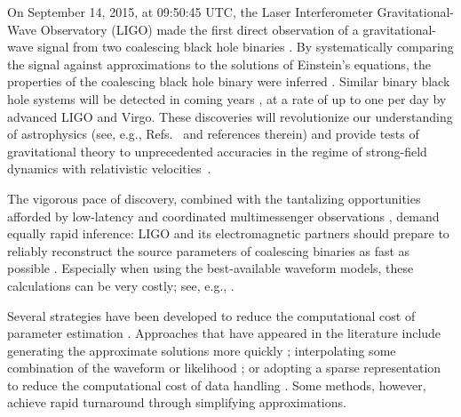 \documentclass[aps,prd,nofootinbib,showpacs,amssymb,twocolumn]{revtex4}
\begin{document}
%
On September 14, 2015, at 09:50:45 UTC, 
the Laser Interferometer Gravitational-Wave Observatory (LIGO) made the first direct 
observation of a gravitational-wave signal from two coalescing black hole binaries \cite{DiscoveryPaper}. By
systematically comparing the signal against approximations to the solutions 
%
of Einstein's equations, the properties of
the coalescing black hole binary  were inferred \cite{PEPaper}. 
%
Similar binary black hole systems will be detected in coming
years \cite{RatesPaper,LIGO-O1-BBH}, at a rate of up to one per day by advanced LIGO and Virgo.  These discoveries will revolutionize our understanding of
astrophysics (see, e.g., 
Refs.~\cite{AstroPaper,2016Natur.534..512B,2016ApJ...824L...8R,2016PhRvL.116t1301B,2016MNRAS.460.3545D} and references therein) and provide tests of gravitational theory to unprecedented accuracies 
in the regime of strong-field dynamics
with relativistic velocities~\cite{TheLIGOScientific:2016src,LIGO-O1-BBH}.

%
%
The  vigorous pace of discovery, combined with the tantalizing opportunities afforded by low-latency and coordinated
multimessenger observations \cite{2016LRR....19....1A}, demand equally rapid inference: LIGO and its electromagnetic partners should prepare to
reliably reconstruct the source parameters of coalescing binaries as fast as possible \cite{LIGO-whitepaper-2015}.  
Especially when using the best-available waveform models, these calculations can be very costly; see, e.g., \cite{SEOBv3Paper}.

Several strategies have been
developed to reduce the 
%
computational cost of parameter estimation \cite{gwastro-pe-Brandon-STF2,gwastro-PE-AlternativeArchitectures,gw-astro-ReducedOrderQuadraturePE-TiglioEtAl2014,2016PhRvD..94d4031S,2017arXiv170302062V}.  
%
Approaches that have appeared in the literature include
%
generating the approximate solutions more quickly \cite{gwastro-mergers-PE-ReducedOrder-2013,2014PhRvX...4c1006F,2013PhRvD..87l2002S,2013PhRvD..87d4008C,gwastro-mergers-IMRPhenomP,gwastro-SpinTaylorF2-2013}; 
%
interpolating some combination
of the waveform or likelihood \cite{gwastro-approx-ROMNR-Blackman2015,2013PhRvD..87d4008C,2013PhRvD..87l2002S,2014CQGra..31s5010P,2014PhRvD..90d4074S,gwastro-PE-AlternativeArchitectures,cole2014likelihood,2012MNRAS.421..169G};  or 
%
adopting a sparse representation to reduce the computational cost of data
handling \cite{antil2013two,gwastro-mergers-PE-ReducedOrder-2013,2016PhRvD..94d4031S,gw-astro-ReducedOrderQuadraturePE-TiglioEtAl2014,gwastro-PE-AlternativeArchitectures}.   %
 Some methods, however, achieve rapid turnaround through simplifying approximations.  
%
\end{document}
